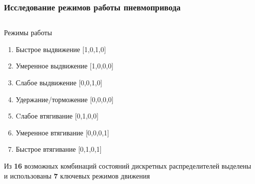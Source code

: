 


\begin{frame}
	\frametitle{Исследование режимов работы пневмопривода}
	\begin{columns}
		\begin{column}{0.45\textwidth}
			\begin{block}{Режимы работы}
				\begin{enumerate}
					\item \scriptsize Быстрое выдвижение \hfill [1,0,1,0]
					\item \scriptsize Умеренное выдвижение \hfill [1,0,0,0]
					\item \scriptsize Слабое выдвижение \hfill [0,0,1,0]
					\item \scriptsize Удержание/торможение \hfill [0,0,0,0]
					\item \scriptsize Cлабое втягивание \hfill [0,1,0,0]
					\item \scriptsize Умеренное втягивание \hfill [0,0,0,1]
					\item \scriptsize Быстрое втягивание \hfill [0,1,0,1]
				\end{enumerate}
			\end{block}

			\begin{block}
				\scriptsize Из \textbf{16} возможных комбинаций состояний дискретных распределителей выделены
				и использованы \textbf{7} ключевых режимов движения
			\end{block}


\end{column}
\end{columns}
\end{frame}

